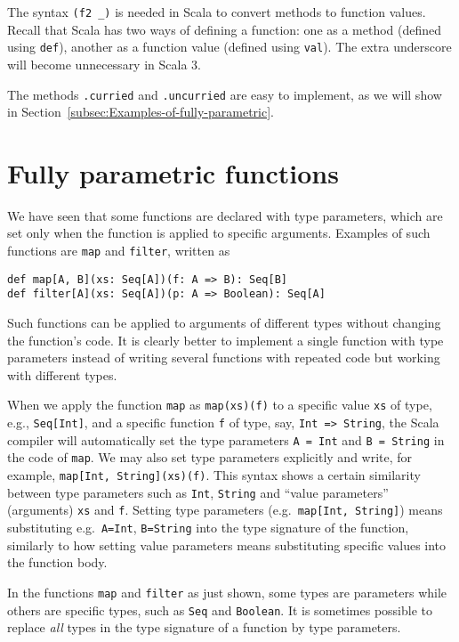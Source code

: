 \noindent The syntax \lstinline!(f2 _)! is needed in Scala to convert
methods to function values. Recall that Scala has two ways of defining
a function: one as a method (defined using \lstinline!def!),
another as a function value (defined using
\lstinline!val!). The extra underscore will become unnecessary in
Scala 3.

The methods \lstinline!.curried! and \lstinline!.uncurried! are
easy to implement, as we will show in Section~\ref{subsec:Examples-of-fully-parametric}.

\section{Fully parametric functions\label{sec:Fully-parametric-functions}}

We have seen that some functions are declared with type parameters,
which are set only when the function is applied to specific arguments.
Examples of such functions are \lstinline!map! and \lstinline!filter!,
written as
\begin{lstlisting}
def map[A, B](xs: Seq[A])(f: A => B): Seq[B]
def filter[A](xs: Seq[A])(p: A => Boolean): Seq[A]
\end{lstlisting}
Such functions can be applied to arguments of different types without
changing the function's code. It is clearly better to implement a
single function with type parameters instead of writing several functions
with repeated code but working with different types.

When we apply the function \lstinline!map! as \lstinline!map(xs)(f)!
to a specific value \lstinline!xs! of type, e.g., \lstinline!Seq[Int]!,
and a specific function \lstinline!f! of type, say, \lstinline!Int => String!,
the Scala compiler will automatically set the type parameters \lstinline!A = Int!
and \lstinline!B = String! in the code of \lstinline!map!. We may
also set type parameters explicitly and write, for example, \lstinline!map[Int, String](xs)(f)!.
This syntax shows a certain similarity between type parameters such
as \lstinline!Int!, \lstinline!String! and ``value parameters''
(arguments) \lstinline!xs! and \lstinline!f!. Setting type parameters
(e.g.~\lstinline!map[Int, String]!) means substituting e.g.~\lstinline!A=Int!,
\lstinline!B=String! into the type signature of the function, similarly
to how setting value parameters means substituting specific values
into the function body.

In the functions \lstinline!map! and \lstinline!filter! as just
shown, some types are parameters while others are specific types,
such as \lstinline!Seq! and \lstinline!Boolean!. It is sometimes
possible to replace \emph{all} types in the type signature of a function
by type parameters.

